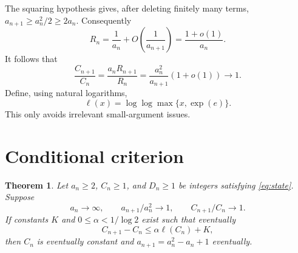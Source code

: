 \documentclass[11pt]{article}
\newtheorem{theorem}{Theorem}
\newcommand{\ellog}{\ell}
\begin{document}
The squaring hypothesis gives, after deleting finitely many terms,
$a_{n+1}\ge a_n^2/2\ge2a_n$. Consequently
\[
 R_n=\frac1{a_n}+O\!\left(\frac1{a_{n+1}}\right)
     =\frac{1+o(1)}{a_n}.
\]
It follows that
\begin{equation}\label{eq:ratio}
 \frac{C_{n+1}}{C_n}
 =\frac{a_nR_{n+1}}{R_n}
 =\frac{a_n^2}{a_{n+1}}(1+o(1))\longrightarrow1.
\end{equation}
Define, using natural logarithms,
\[
 \ellog(x)=\log\log\max\{x,\exp(e)\}.
\]
This only avoids irrelevant small-argument issues.

\section{Conditional criterion}
\begin{theorem}\label{thm:main}
Let $a_n\ge2$, $C_n\ge1$, and $D_n\ge1$ be integers satisfying
\eqref{eq:state}. Suppose
\[
 a_n\to\infty,\qquad a_{n+1}/a_n^2\to1,
 \qquad C_{n+1}/C_n\to1.
\]
If constants $K$ and $0\le\alpha<1/\log2$ exist such that eventually
\begin{equation}\label{eq:envelope}
 C_{n+1}-C_n\le\alpha\ellog(C_n)+K,
\end{equation}
then $C_n$ is eventually constant and
$a_{n+1}=a_n^2-a_n+1$ eventually.
\end{theorem}
\end{document}
